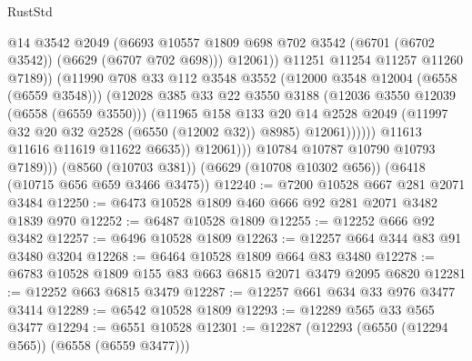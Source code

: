 \begin{lexlean}{RustStd}
\begin{coremodule}
                                  @14
                                  @3542
                                  @2049
                                  (@6693
                                    @10557
                                    @1809
                                    @698
                                    @702
                                    @3542
                                    (@6701 (@6702 @3542))
                                    (@6629 (@6707 @702 @698)))
                                  @12061))
                              @11251
                              @11254
                              @11257
                              @11260
                              @7189))
                          (@11990
                            @708
                            @33
                            @112
                            @3548
                            @3552
                            (@12000 @3548 @12004 (@6558 (@6559 @3548)))
                            (@12028
                              @385
                              @33
                              @22
                              @3550
                              @3188
                              (@12036 @3550 @12039 (@6558 (@6559 @3550)))
                              (@11965
                                @158
                                @133
                                @20
                                @14
                                @2528
                                @2049
                                (@11997 @32 @20 @32 @2528 (@6550 (@12002 @32)) @8985)
                                @12061))))))
                    @11613
                    @11616
                    @11619
                    @11622
                    @6635))
                @12061)))
          @10784
          @10787
          @10790
          @10793
          @7189)))
    (@8560 (@10703 @381))
    (@6629 (@10708 @10302 @656))
    (@6418 (@10715 @656 @659 @3466 @3475))
@12240 := @7200 @10528 @667 @281 @2071 @3484
@12250 := @6473 @10528 @1809 @460 @666 @92 @281 @2071 @3482 @1839 @970
@12252 := @6487 @10528 @1809
@12255 := @12252 @666 @92 @3482
@12257 := @6496 @10528 @1809
@12263 := @12257 @664 @344 @83 @91 @3480 @3204
@12268 := @6464 @10528 @1809 @664 @83 @3480
@12278 := @6783 @10528 @1809 @155 @83 @663 @6815 @2071 @3479 @2095 @6820
@12281 := @12252 @663 @6815 @3479
@12287 := @12257 @661 @634 @33 @976 @3477 @3414
@12289 := @6542 @10528 @1809
@12293 := @12289 @565 @33 @565 @3477
@12294 := @6551 @10528
@12301 := @12287 (@12293 (@6550 (@12294 @565)) (@6558 (@6559 @3477)))

\end{coremodule}
\end{lexlean}
